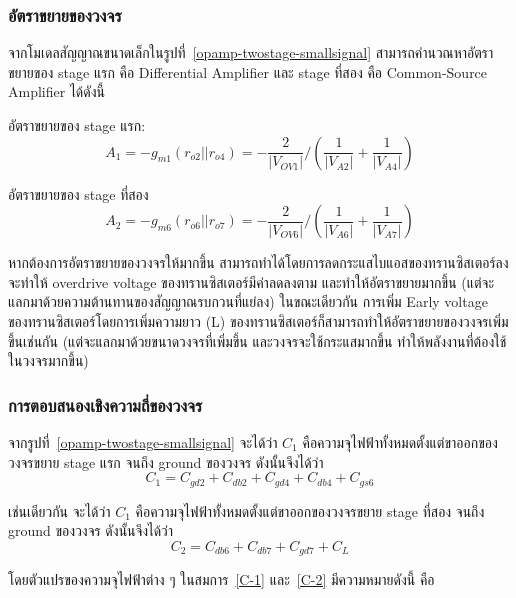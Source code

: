 \documentclass[a4paper, 11pt, oneside]{book} %
\begin{document}
\subsubsection{อัตราขยายของวงจร}

จากโมเดลสัญญาณขนาดเล็กในรูปที่~\ref{opamp-twostage-smallsignal} สามารถคำนวณหาอัตราขยายของ stage แรก คือ Differential Amplifier และ stage ที่สอง คือ Common-Source Amplifier ได้ดังนี้

อัตราขยายของ stage แรก: 
\begin{equation}
    A_1 = -g_{m1}(r_{o2}||r_{o4}) = -\frac{2}{|V_{OV1}|}/( \frac{1}{|V_{A2}|} + \frac{1}{|V_{A4}|} )
    \label{gain-1}
\end{equation}

อัตราขยายของ stage ที่สอง
\begin{equation}
    A_2 = -g_{m6}(r_{o6}||r_{o7}) = -\frac{2}{|V_{OV6}|}/( \frac{1}{|V_{A6}|} + \frac{1}{|V_{A7}|} )
    \label{gain-2}
\end{equation}

หากต้องการอัตราขยายของวงจรให้มากขึ้น สามารถทำได้โดยการลดกระแสไบแอสของทรานซิสเตอร์ลง จะทำให้ overdrive voltage ของทรานซิสเตอร์มีค่าลดลงตาม และทำให้อัตราขยายมากขึ้น (แต่จะแลกมาด้วยความต้านทานของสัญญาณรบกวนที่แย่ลง) ในขณะเดียวกัน การเพิ่ม Early voltage ของทรานซิสเตอร์โดยการเพิ่มความยาว (L) ของทรานซิสเตอร์ก็สามารถทำให้อัตราขยายของวงจรเพิ่มขึ้นเช่นกัน (แต่จะแลกมาด้วยขนาดวงจรที่เพิ่มขึ้น และวงจรจะใช้กระแสมากขึ้น ทำให้พลังงานที่ต้องใช้ในวงจรมากขึ้น)

\subsubsection{การตอบสนองเชิงความถี่ของวงจร}

จากรูปที่~\ref{opamp-twostage-smallsignal} จะได้ว่า $C_1$ คือความจุไฟฟ้าทั้งหมดตั้งแต่ขาออกของวงจรขยาย stage แรก จนถึง ground ของวงจร ดังนั้นจึงได้ว่า
\begin{equation}
    C_1 = C_{gd2} + C_{db2} + C_{gd4} + C_{db4} + C_{gs6}
    \label{C-1}
\end{equation}

เช่นเดียวกัน จะได้ว่า $C_1$ คือความจุไฟฟ้าทั้งหมดตั้งแต่ขาออกของวงจรขยาย stage ที่สอง จนถึง ground ของวงจร ดังนั้นจึงได้ว่า
\begin{equation}
    C_2 = C_{db6} + C_{db7} + C_{gd7} + C_{L}
    \label{C-2}
\end{equation}

โดยตัวแปรของความจุไฟฟ้าต่าง ๆ ในสมการ~\ref{C-1} และ~\ref{C-2} มีความหมายดังนี้ คือ
\end{document}
